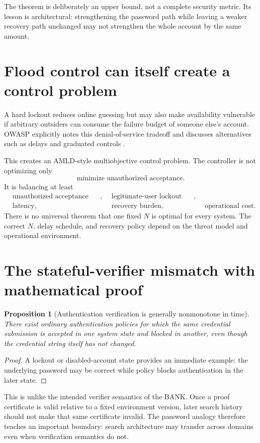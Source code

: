 \documentclass[11pt,openany]{book}
\newtheorem{proposition}[theorem]{Proposition}
\theoremstyle{definition}
\theoremstyle{remark}
\begin{document}
The theorem is deliberately an upper bound, not a complete security metric. Its lesson is architectural: strengthening the password path while leaving a weaker recovery path unchanged may not strengthen the whole account by the same amount.

\section{Flood control can itself create a control problem}
A hard lockout reduces online guessing but may also make availability vulnerable if arbitrary outsiders can consume the failure budget of someone else's account. OWASP explicitly notes this denial-of-service tradeoff and discusses alternatives such as delays and graduated controls \cite{OWASPAuth}.

This creates an AMLD-style multiobjective control problem. The controller is not optimizing only
\[
\text{minimize unauthorized acceptance}.
\]
It is balancing at least
\[
\begin{aligned}
&\text{unauthorized acceptance risk}, &&\text{legitimate-user lockout risk},\\
&\text{latency}, &&\text{recovery burden}, &&\text{operational cost}.
\end{aligned}
\]
There is no universal theorem that one fixed $N$ is optimal for every system. The correct $N$, delay schedule, and recovery policy depend on the threat model and operational environment.

\section{The stateful-verifier mismatch with mathematical proof}
\begin{proposition}[Authentication verification is generally nonmonotone in time]\label{prop:authnonmono}
There exist ordinary authentication policies for which the same credential submission is accepted in one system state and blocked in another, even though the credential string itself has not changed.
\end{proposition}
\begin{proof}
A lockout or disabled-account state provides an immediate example: the underlying password may be correct while policy blocks authentication in the later state.
\end{proof}

This is unlike the intended verifier semantics of the BANK. Once a proof certificate is valid relative to a fixed environment version, later search history should not make that same certificate invalid. The password analogy therefore teaches an important boundary: search architecture may transfer across domains even when verification semantics do not.
\end{document}

